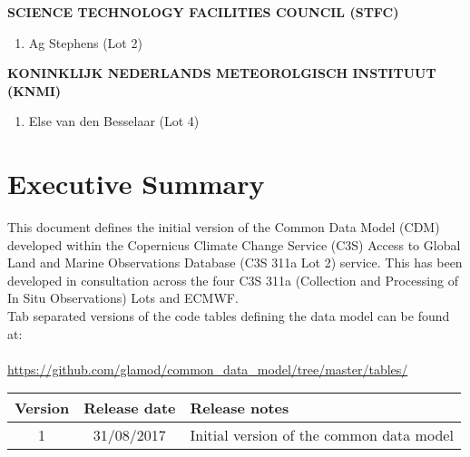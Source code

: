 \documentclass[a4paper,12pt]{article}
\begin{document}
\begin{adjustwidth}{2.cm}{}
{\fontsize{14}{17} \selectfont \textbf{\uppercase{Science Technology Facilities Council (STFC)}}}
\begin{enumerate}
\item Ag Stephens (Lot 2)\\
\end{enumerate}

{\fontsize{14}{17} \selectfont \textbf{\uppercase{Koninklijk Nederlands Meteorolgisch Instituut (KNMI)}}}
\begin{enumerate}
\item Else van den Besselaar (Lot 4)
\end{enumerate}

\end{adjustwidth}


\newpage

\section*{Executive Summary}
This document defines the initial version of the Common Data Model (CDM) developed within the Copernicus Climate Change Service (C3S) Access to Global Land and Marine Observations Database (C3S 311a Lot 2) service. This has been developed in consultation across the four C3S 311a (Collection and Processing of In Situ Observations) Lots and ECMWF.\\

Tab separated versions of the code tables defining the data model can be found at:\\ \\
\tabto{2cm} \url{https://github.com/glamod/common_data_model/tree/master/tables/}

\begin{table}[H]
\centering
\begin{tabular}{|c|c|l|}
\hline
\textbf{Version} & \textbf{Release date} & \textbf{Release notes}\\
\hline
1 & 31/08/2017 & Initial version of the common data model\\
\hline
\end{tabular}
\end{table}
\end{document}
